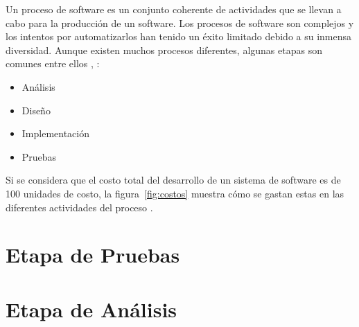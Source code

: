 Un proceso de software es un conjunto coherente de actividades que se llevan a cabo para la producción de un software. Los procesos de software son complejos y los intentos por automatizarlos han tenido un éxito limitado debido a su inmensa diversidad. Aunque existen muchos procesos diferentes, algunas etapas son comunes entre ellos \cite{sommerville1992software}, \cite{pressman2005software}:
\begin{itemize}
	\item Análisis
	\item Diseño
	\item Implementación
	\item Pruebas
\end{itemize}


Si se considera que el costo total del desarrollo de un sistema de software es de 100 unidades de costo, la figura~\ref{fig:costos}  muestra cómo se gastan estas en las diferentes actividades del proceso \cite{sommerville1992software}. 


\section{Etapa de Pruebas}

\section{Etapa de Análisis}



